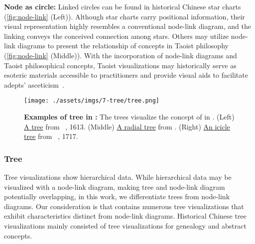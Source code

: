 \textbf{Node as circle:}
Linked circles can be found in historical Chinese star charts (\cref{fig:node-link} (Left)).
Although star charts carry positional information, their visual representation highly resembles a conventional node-link diagram, and the linking conveys the conceived connection among stars.
Others may utilize node-link diagrams to present the relationship of concepts in Taoist philosophy (\cref{fig:node-link} (Middle)).
With the incorporation of node-link diagrams and Taoist philosophical concepts, Taoist visualizations may historically serve as esoteric materials accessible to practitioners and provide visual aids to facilitate adepts' asceticism~\cite{Huang2015Picturing}.

\begin{figure}[!tb]
    \centering
    \texttt{[image: ./assets/imgs/7-tree/tree.png]}
    \caption{
        \textbf{Examples of tree in \datasetName:}
        The trees visualize the concept of  in .
        (Left)
        \href{https://dl.ndl.go.jp/pid/2596441/1/46}{A tree}
        from ~\cite{Huang1613Tu}, 1613.
        (Middle)
        \href{https://dl.ndl.go.jp/pid/2596441/1/58}{A radial tree}
        from .
        (Right)
        \href{https://iiif.lib.harvard.edu/manifests/view/drs:53063658$144i}{An icicle tree}
        from ~\cite{Li1717Yu}, 1717.
 }
    \label{fig:tree}
\end{figure}

\subsubsection{Tree}

Tree visualizations show hierarchical data.
While hierarchical data may be visualized with a node-link diagram, making tree and node-link diagram potentially overlapping, in this work, we differentiate trees from node-link diagrams.
Our consideration is that \datasetName contains numerous tree visualizations that exhibit characteristics distinct from node-link diagrams.
Historical Chinese tree visualizations mainly consisted of tree visualizations for genealogy and abstract concepts.

